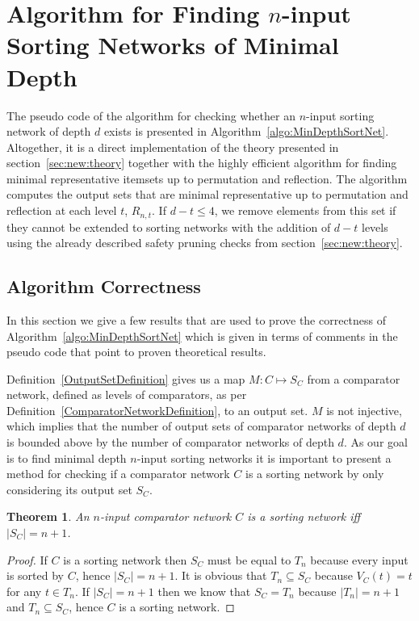 \documentclass[13pt,a4paper]{article}
\newtheorem{theorem}{Theorem}[section]
\begin{document}
\section{Algorithm for Finding $n$-input Sorting Networks of Minimal Depth}
\label{sec:algorithm}

The pseudo code of the algorithm for checking whether an $n$-input sorting network of depth $d$ exists is presented in Algorithm~\ref{algo:MinDepthSortNet}. Altogether, it is a direct implementation of the theory presented in section~\ref{sec:new:theory} together with the highly efficient algorithm \cite{Marinov:SortingNetworks:ThirdLevel} for finding minimal representative itemsets up to permutation and reflection. The algorithm computes the output sets that are minimal representative up to permutation and reflection at each level $t$, $R_{n, t}$. If $d - t \leq 4$, we remove elements from this set if they cannot be extended to sorting networks with the addition of $d- t$ levels using the already described safety pruning checks from section~\ref{sec:new:theory}.

\subsection{Algorithm Correctness}
\label{sec:algorithm:correctness}
In this section we give a few results that are used to prove the correctness of Algorithm~\ref{algo:MinDepthSortNet} which is given in terms of comments in the pseudo code that point to proven theoretical results.

Definition~\ref{OutputSetDefinition} gives us a map $M : C \mapsto S_C$ from a comparator network, defined as levels of comparators, as per Definition~\ref{ComparatorNetworkDefinition}, to an output set. $M$ is not injective, which implies that the number of output sets of comparator networks of depth $d$ is bounded above by the number of comparator networks of depth $d$. As our goal is to find minimal depth $n$-input sorting networks it is important to present a method for checking if a comparator network $C$ is a sorting network by only considering its output set $S_C$.

\begin{theorem}
\label{SortinNetworkOutputSetSizeTheorem}
An $n$-input comparator network $C$ is a sorting network iff $|S_C| = n + 1$.
\end{theorem}

\begin{proof}
If $C$ is a sorting network then $S_C$ must be equal to $T_n$ because every input is sorted by $C$, hence $|S_C| = n + 1$. It is obvious that $T_n \subseteq S_C$ because $V_C(t) = t$ for any $t \in T_n$. If $|S_C| = n + 1$ then we know that $S_C = T_n$ because $|T_n| = n + 1$ and $T_n \subseteq S_C$, hence $C$ is a sorting network.
\end{proof}
\end{document}
